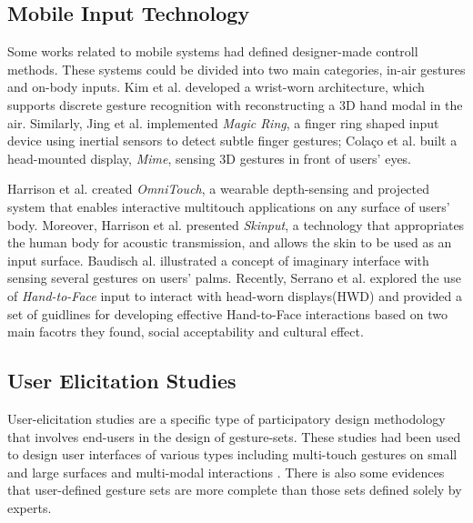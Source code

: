 \documentclass{sigchi}
\begin{document}
    \subsection{Mobile Input Technology}
    Some works related to mobile systems had defined designer-made controll methods. These systems could be divided into two main categories, in-air gestures and on-body inputs. Kim et al.\cite{Kim:2012:DFI:2380116.2380139} developed a wrist-worn architecture, which supports discrete gesture recognition with reconstructing a 3D hand modal in the air. Similarly, Jing et al.\cite{Jing:2013:MRS:2541831.2541875} implemented \textsl{Magic Ring}, a finger ring shaped input device using inertial sensors to detect subtle finger gestures; Cola\c{c}o et al.\cite{Colaco:2013:MCL:2501988.2502042} built a head-mounted display, \textsl{Mime}, sensing 3D gestures in front of users' eyes. 

    Harrison et al.\cite{Harrison:2011:OWM:2047196.2047255} created \textsl{OmniTouch}, a wearable depth-sensing and projected system that enables interactive multitouch applications on any surface of users' body. Moreover, Harrison et al.\cite{Harrison:2010:SAB:1753326.1753394} presented \textsl{Skinput}, a technology that appropriates the human body for acoustic transmission, and allows the skin to be used as an input surface. Baudisch al.\cite{Gustafson:2011:IPL:2047196.2047233} illustrated a concept of imaginary interface with sensing several gestures on users' palms. Recently, Serrano et al.\cite{Serrano:2014:EUH:2611247.2556984} explored the use of \textsl{Hand-to-Face} input to interact with head-worn displays(HWD) and provided a set of guidlines for developing effective Hand-to-Face interactions based on two main facotrs they found, social acceptability and cultural effect.

    \subsection{User Elicitation Studies}
    User-elicitation studies are a specific type of participatory design methodology that involves end-users in the design of gesture-sets\cite{Good:1984:BUI:358274.358284,Morris:2012:WWI:2396636.2396651}. These studies had been used to design user interfaces of various types including multi-touch gestures on small and large surfaces\cite{Anthony:2012:IRC:2396636.2396671,Epps:2006:SHS:1125451.1125601,Wobbrock:2009:UGS:1518701.1518866,Findlater:2012:BQA:2207676.2208660} and multi-modal interactions \cite{Morris:2012:WWI:2396636.2396651,Valdes:2014:EDS:2611222.2557373}. There is also some evidences that user-defined gesture sets are more complete than those sets defined solely by experts\cite{Anthony:2012:IRC:2396636.2396671,Pyryeskin:2012:CEG:2396636.2396638,Wobbrock:2009:UGS:1518701.1518866}.
\end{document}
